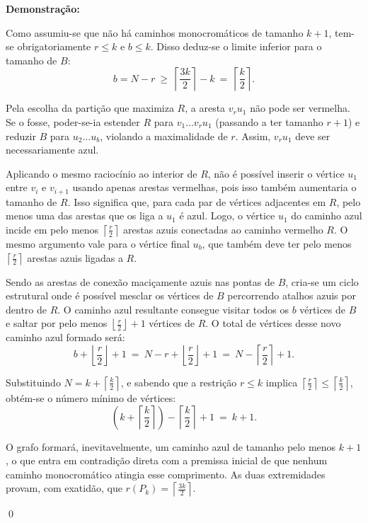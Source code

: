 \documentclass[12pt]{article}
\newenvironment{sol}
    {\textbf{Demonstração:}\emph{}
    }
    {
    \qed
    }
\begin{document}
\begin{sol}
    Como assumiu-se que não há caminhos monocromáticos de tamanho $k+1$, tem-se obrigatoriamente $r \le k$ e $b \le k$. Disso deduz-se o limite inferior para o tamanho de $B$:
    \[
        b = N - r \ \ge \ \left\lceil \frac{3k}{2} \right\rceil - k \ = \ \left\lceil \frac{k}{2} \right\rceil.
    \]
    
    Pela escolha da partição que maximiza $R$, a aresta $v_r u_1$ não pode ser vermelha. Se o fosse, poder-se-ia estender $R$ para $v_1 \dots v_r u_1$ (passando a ter tamanho $r+1$) e reduzir $B$ para $u_2 \dots u_b$, violando a maximalidade de $r$. Assim, $v_r u_1$ deve ser necessariamente azul.
    
    Aplicando o mesmo raciocínio ao interior de $R$, não é possível inserir o vértice $u_1$ entre $v_i$ e $v_{i+1}$ usando apenas arestas vermelhas, pois isso também aumentaria o tamanho de $R$. Isso significa que, para cada par de vértices adjacentes em $R$, pelo menos uma das arestas que os liga a $u_1$ é azul. Logo, o vértice $u_1$ do caminho azul incide em pelo menos $\left\lceil \frac{r}{2} \right\rceil$ arestas azuis conectadas ao caminho vermelho $R$. O mesmo argumento vale para o vértice final $u_b$, que também deve ter pelo menos $\left\lceil \frac{r}{2} \right\rceil$ arestas azuis ligadas a $R$.
    
    Sendo as arestas de conexão maciçamente azuis nas pontas de $B$, cria-se um ciclo estrutural onde é possível mesclar os vértices de $B$ percorrendo atalhos azuis por dentro de $R$. O caminho azul resultante consegue visitar todos os $b$ vértices de $B$ e saltar por pelo menos $\left\lfloor \frac{r}{2} \right\rfloor + 1$ vértices de $R$. O total de vértices desse novo caminho azul formado será:
    \[
        b + \left\lfloor \frac{r}{2} \right\rfloor + 1 \ = \ N - r + \left\lfloor \frac{r}{2} \right\rfloor + 1 \ = \ N - \left\lceil \frac{r}{2} \right\rceil + 1.
    \]
    
    Substituindo $N = k + \left\lceil \frac{k}{2} \right\rceil$, e sabendo que a restrição $r \le k$ implica $\left\lceil \frac{r}{2} \right\rceil \le \left\lceil \frac{k}{2} \right\rceil$, obtém-se o número mínimo de vértices:
    \[
        \left(k + \left\lceil \frac{k}{2} \right\rceil\right) - \left\lceil \frac{k}{2} \right\rceil + 1 \ = \ k + 1.
    \]
    
    O grafo formará, inevitavelmente, um caminho azul de tamanho pelo menos $k+1$, o que entra em contradição direta com a premissa inicial de que nenhum caminho monocromático atingia esse comprimento. As duas extremidades provam, com exatidão, que $r(P_k) = \left\lceil \frac{3k}{2} \right\rceil$.
\end{sol}
\end{document}
